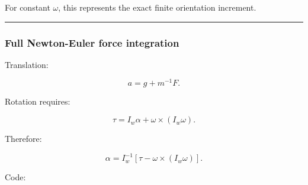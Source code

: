 For constant \(\omega\), this represents the exact finite orientation increment.

\begin{center}\rule{0.5\linewidth}{0.5pt}\end{center}

\subsubsection{Full Newton-Euler force integration}\label{full-newton-euler-force-integration}

Translation:

\[
a
=
g+
m^{-1}F.
\]

Rotation requires:

\[
\tau
=
I_w\alpha+
\omega\times(I_w\omega).
\]

Therefore:

\[
\boxed{
\alpha
=
I_w^{-1}
[
\tau-
\omega\times(I_w\omega)
].
}
\]

Code:

